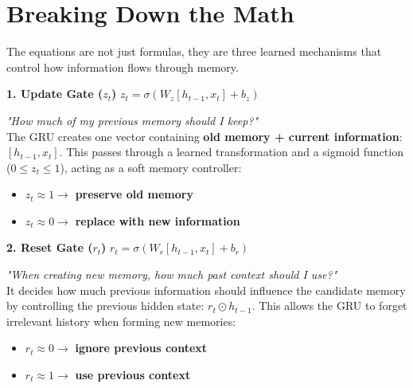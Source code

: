 \documentclass[11pt]{article}
\begin{document}
\section*{Breaking Down the Math}

\vspace{0.05in}

{\fontsize{10}{12}\selectfont\color{brandgray}
The equations are not just formulas, they are three learned mechanisms that control how information flows through memory.
}

\vspace{0.15in}

\begin{darkbox}[top=8pt, bottom=8pt, left=12pt, right=12pt]
{\large\color{brandlight}\textbf{1. Update Gate ($z_t$)}} \quad $z_t=\sigma(W_z[h_{t-1},x_t]+b_z)$

\vspace{0.05in}
{\fontsize{10}{12}\selectfont
\textit{"How much of my previous memory should I keep?"} \\
The GRU creates one vector containing \textbf{old memory + current information}: $[h_{t-1},x_t]$. This passes through a learned transformation and a sigmoid function ($0 \leq z_t \leq 1$), acting as a soft memory controller:
\begin{itemize}[leftmargin=*, itemsep=0pt, parsep=0pt, topsep=3pt, label={\color{brandlight}\textbullet}]
    \item $z_t \approx 1 \rightarrow$ \textbf{preserve old memory}
    \item $z_t \approx 0 \rightarrow$ \textbf{replace with new information}
\end{itemize}
}
\end{darkbox}

\vspace{0.1in}

\begin{darkbox}[top=8pt, bottom=8pt, left=12pt, right=12pt]
{\large\color{brandlight}\textbf{2. Reset Gate ($r_t$)}} \quad $r_t=\sigma(W_r[h_{t-1},x_t]+b_r)$

\vspace{0.05in}
{\fontsize{10}{12}\selectfont
\textit{"When creating new memory, how much past context should I use?"} \\
It decides how much previous information should influence the candidate memory by controlling the previous hidden state: $r_t\odot h_{t-1}$. This allows the GRU to forget irrelevant history when forming new memories:
\begin{itemize}[leftmargin=*, itemsep=0pt, parsep=0pt, topsep=3pt, label={\color{brandlight}\textbullet}]
    \item $r_t \approx 0 \rightarrow$ \textbf{ignore previous context}
    \item $r_t \approx 1 \rightarrow$ \textbf{use previous context}
\end{itemize}
}
\end{darkbox}
\end{document}
